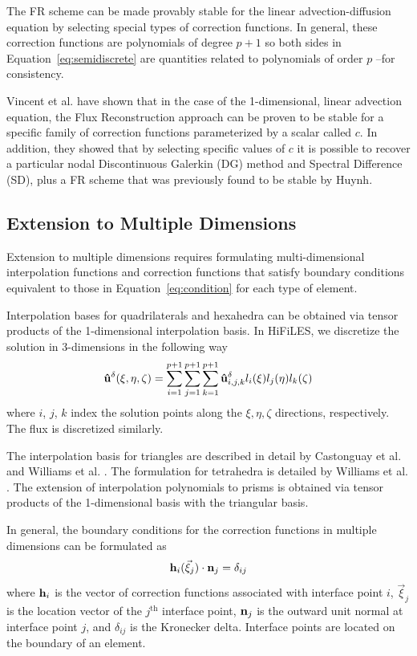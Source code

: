 The FR scheme can be made provably stable for the linear advection-diffusion equation by selecting special types of correction functions\cite{castonguay2013}. In general, these correction functions are polynomials of degree $p+1$ so both sides in Equation~\eqref{eq:semidiscrete} are quantities related to polynomials of order $p$ --for consistency\cite{huynh2007}.

Vincent et al. \cite{vincent2011new} have shown that in the case of the 1-dimensional, linear advection equation, the Flux Reconstruction approach can be proven to be stable for a specific family of correction functions parameterized by a scalar called $c$. In addition, they showed that by selecting specific values of $c$ it is possible to recover a particular nodal Discontinuous Galerkin (DG) method and Spectral Difference (SD), plus a FR scheme that was previously found to be stable by Huynh\cite{huynh2007flux}.

\subsection{Extension to Multiple Dimensions}

Extension to multiple dimensions requires formulating multi-dimensional interpolation functions and correction functions that satisfy boundary conditions equivalent to those in Equation~\eqref{eq:condition} for each type of element.

Interpolation bases for quadrilaterals and hexahedra can be obtained via tensor products of the 1-dimensional interpolation basis. In HiFiLES, we discretize the solution in 3-dimensions in the following way
\begin{equation}
{\bf \hat{u}}^\delta(\xi,\eta,\zeta) = \sum_{i=1}^{p+1} \sum_{j=1}^{p+1} \sum_{k=1}^{p+1}
{\bf \hat{u}}^\delta_{i,j,k} l_i(\xi) l_j(\eta) l_k(\zeta)
\end{equation}
where $i$, $j$, $k$ index the solution points along the $\xi, \eta, \zeta$ directions, respectively. The flux is discretized similarly.

The interpolation basis for triangles are described in detail by Castonguay et al. \cite{castonguay2012new} and Williams et al. \cite{williams2013tri}. The formulation for tetrahedra is detailed by Williams et al. \cite{williams2013tet}. The extension of interpolation polynomials to prisms is obtained via tensor products of the 1-dimensional basis with the triangular basis\cite{castonguay2011}. 

In general, the boundary conditions for the correction functions in multiple dimensions can be formulated as
\begin{equation}\label{eq:genConstraint}
{\bf h}_i( \vec{\xi}_j)\cdot {\bf n}_j = \delta_{ij}
\end{equation}
where ${\bf h}_i$ is the vector of correction functions associated with interface point $i$, $\vec{\xi}_j$ is the location vector of the $j^\text{th}$ interface point, ${\bf n}_j$ is the outward unit normal at interface point $j$, and $\delta_{ij}$ is the Kronecker delta. Interface points are located on the boundary of an element.

